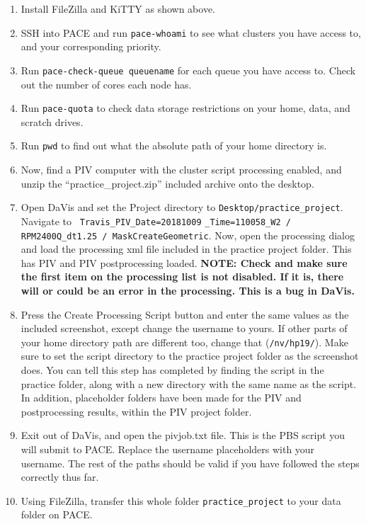 \documentclass{article}
\newcommand{\quotes}[1]{``#1''}
\begin{document}
	\begin{enumerate}
		\item Install FileZilla and KiTTY as shown above.
		\item SSH into PACE and run \texttt{pace-whoami} to see what clusters you have access to, and your corresponding priority.
		\item Run \texttt{pace-check-queue queuename} for each queue you have access to. Check out the number of cores each node has.
		\item Run \texttt{pace-quota} to check data storage restrictions on your home, data, and scratch drives.
		\item Run \texttt{pwd} to find out what the absolute path of your home directory is.
		\item Now, find a PIV computer with the cluster script processing enabled, and unzip the \quotes{practice\_project.zip} included archive onto the desktop.
		\item Open DaVis and set the Project directory to \texttt{Desktop/practice\_project}.  Navigate to \texttt{ Travis\_PIV\_Date=20181009} \texttt{\_Time=110058\_W2 / RPM2400Q\_dt1.25 / MaskCreateGeometric}.  Now, open the processing dialog and load the processing xml file included in the practice project folder.  This has PIV and PIV postprocessing loaded.  \textbf{NOTE: Check and make sure the first item on the processing list is not disabled.  If it is, there will or could be an error in the processing.  This is a bug in DaVis.}
		\item Press the Create Processing Script button and enter the same values as the included screenshot, except change the username to yours.  If other parts of your home directory path are different too, change that (\texttt{/nv/hp19/}).  Make sure to set the script directory to the practice project folder as the screenshot does.  You can tell this step has completed by finding the script in the practice folder, along with a new directory with the same name as the script.  In addition, placeholder folders have been made for the PIV and postprocessing results, within the PIV project folder.
		\item Exit out of DaVis, and open the pivjob.txt file.  This is the PBS script you will submit to PACE.  Replace the username placeholders with your username.  The rest of the paths should be valid if you have followed the steps correctly thus far.
		\item Using FileZilla, transfer this whole folder \texttt{practice\_project} to your data folder on PACE.

\end{enumerate}
\end{document}
